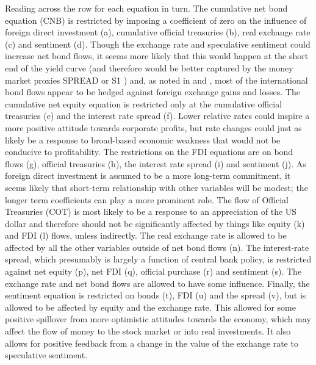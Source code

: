 \documentclass[12pt, a4paper, oneside]{article}\usepackage[]{graphicx}\usepackage[]{color}
\begin{document}
Reading across the row for each equation in turn. The cumulative net bond equation (CNB) is restricted by imposing a coefficient of zero on the influence of foreign direct investment (a), cumulative official treasuries (b), real exchange rate (c) and sentiment (d).  Though the exchange rate and speculative sentiment could increase net bond flows, it seems more likely that this would happen at the short end of the yield curve (and therefore would be better captured by the money market proxies SPREAD or S1 ) and, as noted in \citep[p. 3]{Siourounis2004Capital} and \citep{HauEquity}, most of the international bond flows appear to be hedged against foreign exchange gains and losses.    The cumulative net equity equation is restricted only at the cumulative official treasuries (e) and the interest rate spread (f).  Lower relative rates could inspire a more positive attitude towards corporate profits, but rate changes could just as likely be a response to broad-based economic weakness that would not be conducive to profitability. The restrictions on the FDI equations are on bond flows (g), official treasuries (h), the interest rate spread (i) and sentiment (j).  As foreign direct investment is assumed to be a more long-term commitment, it seems likely that short-term relationship with other variables will be modest; the longer term coefficients can play a more prominent role.   The flow of Official Treasuries (COT) is most likely to be a response to an appreciation of the US dollar and therefore should not be significantly affected by things like equity (k) and FDI (l) flows, unless indirectly.  The real exchange rate is allowed to be affected by all the other variables outside of net bond flows (n).  The interest-rate spread, which presumably is largely a function of central bank policy, is restricted against net equity (p), net FDI (q), official purchase (r) and sentiment (s).  The exchange rate and net bond flows are allowed to have some influence.  Finally, the sentiment equation is restricted on bonds (t), FDI (u) and the spread (v), but is allowed to be affected by equity and the exchange rate.  This allowed for some positive spillover from more optimistic attitudes towards the economy, which may affect the flow of money to the stock market or into real investments.   It also allows for positive feedback from a change in the value of the exchange rate to speculative sentiment. 
\end{document}
